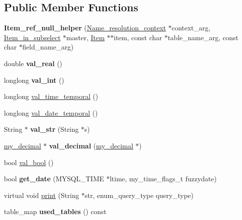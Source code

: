\subsection*{Public Member Functions}
\begin{DoxyCompactItemize}
\item 
\mbox{\label{classItem__ref__null__helper_a2ab1b26c065a43f7ea4675b6448dfc83}} 
{\bfseries Item\+\_\+ref\+\_\+null\+\_\+helper} (\mbox{\hyperlink{structName__resolution__context}{Name\+\_\+resolution\+\_\+context}} $\ast$context\+\_\+arg, \mbox{\hyperlink{classItem__in__subselect}{Item\+\_\+in\+\_\+subselect}} $\ast$master, \mbox{\hyperlink{classItem}{Item}} $\ast$$\ast$item, const char $\ast$table\+\_\+name\+\_\+arg, const char $\ast$field\+\_\+name\+\_\+arg)
\item 
\mbox{\label{classItem__ref__null__helper_a078ebf9be55fa74bc12be5771405f014}} 
double {\bfseries val\+\_\+real} ()
\item 
\mbox{\label{classItem__ref__null__helper_a12188dcb3507a443b12874844a4c4dfb}} 
longlong {\bfseries val\+\_\+int} ()
\item 
longlong \mbox{\hyperlink{classItem__ref__null__helper_a310f77154e5867053304bd27d75cbb53}{val\+\_\+time\+\_\+temporal}} ()
\item 
longlong \mbox{\hyperlink{classItem__ref__null__helper_ae8e303c9b0015a81a80607ff31cdf57e}{val\+\_\+date\+\_\+temporal}} ()
\item 
\mbox{\label{classItem__ref__null__helper_a7c9bc0c45c3bc72eaa62fcab4057c72b}} 
String $\ast$ {\bfseries val\+\_\+str} (String $\ast$s)
\item 
\mbox{\label{classItem__ref__null__helper_ae7ed7a2923d3beeeee5523dde8f150bf}} 
\mbox{\hyperlink{classmy__decimal}{my\+\_\+decimal}} $\ast$ {\bfseries val\+\_\+decimal} (\mbox{\hyperlink{classmy__decimal}{my\+\_\+decimal}} $\ast$)
\item 
bool \mbox{\hyperlink{classItem__ref__null__helper_ae2f622d4bb13a40800c5293c07f56334}{val\+\_\+bool}} ()
\item 
\mbox{\label{classItem__ref__null__helper_a78aa5a928543121032e44b3b9b93ae48}} 
bool {\bfseries get\+\_\+date} (M\+Y\+S\+Q\+L\+\_\+\+T\+I\+ME $\ast$ltime, my\+\_\+time\+\_\+flags\+\_\+t fuzzydate)
\item 
virtual void \mbox{\hyperlink{classItem__ref__null__helper_a89293e68530fb3b07572c5005c3220c8}{print}} (String $\ast$str, enum\+\_\+query\+\_\+type query\+\_\+type)
\item 
\mbox{\label{classItem__ref__null__helper_a660f740843e29dc5a9f2815c2687ed6b}} 
table\+\_\+map {\bfseries used\+\_\+tables} () const
\end{DoxyCompactItemize}
